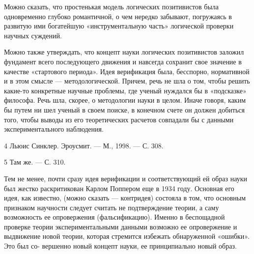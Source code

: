 \documentclass[11pt,a4paper]{article}
\begin{document}
Можно сказать, что простенькая модель логических позитивистов была
одновременно глубоко романтичной, о чем нередко забывают, погружаясь в
развитую ими богатейшую «инструментальную часть» логической проверки научных
суждений.

Можно также утверждать, что концепт науки логических позитивистов заложил
фундамент всего последующего движения и навсегда сохранит свое значение в
качестве «стартового периода». Идея верификация была, бесспорно, нормативной
и в этом смысле — методологической. Причем, речь не шла о том, чтобы решить
какие-то конкретные научные проблемы, где ученый нуждался бы в «подсказке»
философа. Речь шла, скорее, о методологии науки в целом. Иначе говоря, каким
бы путем ни шел ученый в своем поиске, в конечном счете он должен добиться
того, чтобы выводы из его теоретических расчетов совпадали бы с данными
экспериментального наблюдения.

4 Льюис Синклер. Эроусмит. — М., 1998. — С. 308.

5 Там же. — С. 310.

Тем не менее, почти сразу идея верификации и соответствующий ей образ науки
был жестко раскритикован Карлом Поппером еще в 1934 году. Основная его идея,
как известно, (можно сказать — контридея) состояла в том, что основным
признаком научности следует считать не подтверждение теории, а саму
возможность ее опровержения (фальсификацию). Именно в беспощадной проверке
теории экспериментальными данными возможно ее опровержение и выдвижение новой
теории, которая стремится избежать обнаруженной «ошибки». Это был со-
вершенно новый концепт науки, ее принципиально новый образ.
\end{document}
